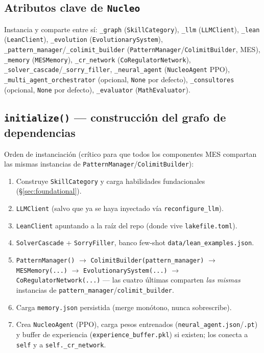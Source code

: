 \documentclass[11pt,a4paper]{report}
\newcommand{\code}[1]{\texttt{#1}}
\begin{document}
\subsection{Atributos clave de \code{Nucleo}}
Instancia y comparte entre s\'i: \code{\_graph} (\code{SkillCategory}), \code{\_llm} (\code{LLMClient}), \code{\_lean} (\code{LeanClient}), \code{\_evolution} (\code{EvolutionarySystem}), \code{\_pattern_manager}/\code{\_colimit_builder} (\code{PatternManager}/\code{ColimitBuilder}, MES), \code{\_memory} (\code{MESMemory}), \code{\_cr_network} (\code{CoRegulatorNetwork}), \code{\_solver_cascade}/\code{\_sorry_filler}, \code{\_neural_agent} (\code{NucleoAgent} PPO), \code{\_multi_agent_orchestrator} (opcional, \code{None} por defecto), \code{\_consultores} (opcional, \code{None} por defecto), \code{\_evaluator} (\code{MathEvaluator}).

\subsection{\code{initialize()} --- construcci\'on del grafo de dependencias}
Orden de instanciaci\'on (cr\'itico para que todos los componentes MES compartan las mismas instancias de \code{PatternManager}/\code{ColimitBuilder}):
\begin{enumerate}
  \item Construye \code{SkillCategory} y carga habilidades fundacionales (\S\ref{sec:foundational}).
  \item \code{LLMClient} (salvo que ya se haya inyectado v\'ia \code{reconfigure_llm}).
  \item \code{LeanClient} apuntando a la ra\'iz del repo (donde vive \code{lakefile.toml}).
  \item \code{SolverCascade} + \code{SorryFiller}, banco few-shot \code{data/lean\_examples.json}.
  \item \code{PatternManager()} $\to$ \code{ColimitBuilder(pattern\_manager)} $\to$ \code{MESMemory(...)} $\to$ \code{EvolutionarySystem(...)} $\to$ \code{CoRegulatorNetwork(...)} --- las cuatro \'ultimas comparten \emph{las mismas} instancias de \code{pattern\_manager}/\code{colimit\_builder}.
  \item Carga \code{memory.json} persistida (merge mon\'otono, nunca sobrescribe).
  \item Crea \code{NucleoAgent} (PPO), carga pesos entrenados (\code{neural\_agent.json}/\code{.pt}) y buffer de experiencia (\code{experience\_buffer.pkl}) si existen; los conecta a \code{self} y a \code{self.\_cr\_network}.
\end{enumerate}
\end{document}
